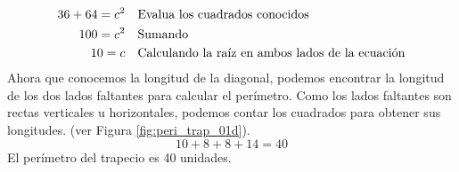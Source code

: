 \begin{solutionbox}{16cm}
\begin{minipage}{0.55\textwidth}
\begin{align*}
            36 +64 =c^2   & \text{\quad Evalua los cuadrados conocidos}                   \\
            100=c^2       & \text{\quad Sumando }                                         \\
            10=c          & \text{\quad Calculando la raíz en ambos lados de la ecuación} \\
        \end{align*}
        Ahora que conocemos la longitud de la diagonal, podemos encontrar la longitud de los dos lados faltantes para calcular el perímetro.
        Como los lados faltantes son rectas verticales u horizontales, podemos contar los cuadrados para obtener sus longitudes. (ver Figura \ref{fig:peri_trap_01d}).
        \[10+8+8+14=40\]
        El perímetro del trapecio es 40 unidades.
    \end{minipage}
\end{solutionbox}
